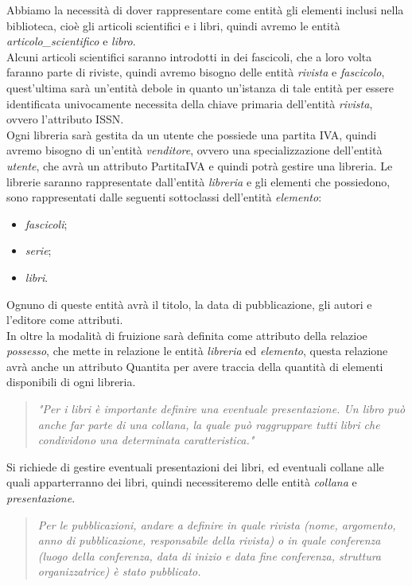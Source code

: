 \documentclass{article}
\begin{document}
Abbiamo la necessità di dover rappresentare come entità gli elementi inclusi nella biblioteca, cioè gli articoli scientifici e i libri, quindi avremo le entità \textit{articolo\_scientifico} e \textit{libro}.\\
Alcuni articoli scientifici saranno introdotti in dei fascicoli, che a loro volta faranno parte di riviste, quindi avremo bisogno delle entità \textit{rivista} e \textit{fascicolo}, quest'ultima sarà un'entità debole in quanto un'istanza di tale entità per essere identificata univocamente necessita della chiave primaria dell'entità \textit{rivista}, ovvero l'attributo ISSN.\\
Ogni libreria sarà gestita da un utente che possiede una partita IVA, quindi avremo bisogno di un'entità \textit{venditore}, ovvero una specializzazione dell'entità \textit{utente}, che avrà un attributo PartitaIVA e quindi potrà gestire una libreria. Le librerie saranno rappresentate dall'entità \textit{libreria} e gli elementi che possiedono, sono rappresentati dalle seguenti sottoclassi dell'entità \textit{elemento}: \begin{itemize} 
\item \textit{fascicoli}; 
\item \textit{serie};
\item \textit{libri}.
\end{itemize}
Ognuno di queste entità avrà il titolo, la data di pubblicazione, gli autori e l'editore come attributi.\\
In oltre la modalità di fruizione sarà definita come attributo della relazioe \textit{possesso}, che mette in relazione le entità \textit{libreria} ed \textit{elemento}, questa relazione avrà anche un attributo Quantita per avere traccia della quantità di elementi disponibili di ogni libreria.

\begin{quote}
\textit{"Per i libri è importante definire una eventuale presentazione. Un libro può anche far parte di una collana, la quale può raggruppare tutti libri che condividono una determinata caratteristica."}
\end{quote}

Si richiede di gestire eventuali presentazioni dei libri, ed eventuali collane alle quali apparterranno dei libri, quindi necessiteremo delle entità \textit{collana} e \textit{presentazione}.

\begin{quote}
\textit{Per le pubblicazioni, andare a definire in quale rivista (nome, argomento, anno di pubblicazione, responsabile della rivista) o in quale conferenza (luogo della conferenza, data di inizio e data fine conferenza, struttura organizzatrice) è stato pubblicato.}
\end{quote}
\end{document}
